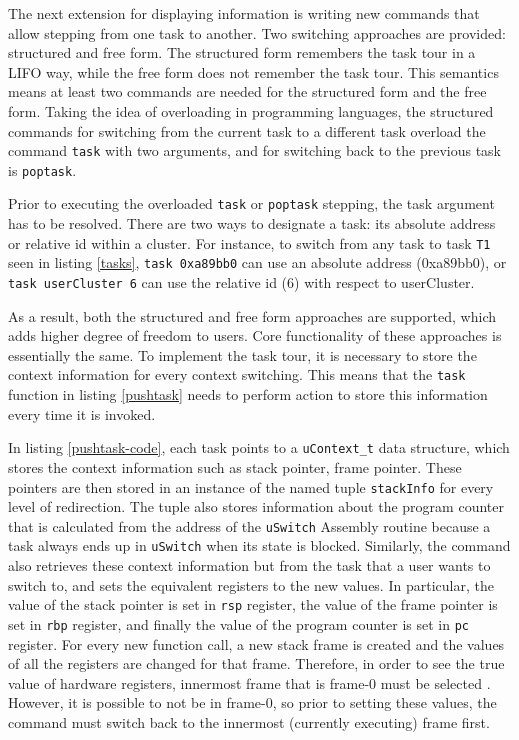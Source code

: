 The next extension for displaying information is writing new commands that allow
stepping from one \uCCS task to another. Two switching approaches are
provided: structured and free form. The structured form remembers the task tour in a
LIFO way, while the free form does not remember the task tour. This semantics means
at least two commands are needed for the structured form and the free form.
Taking the idea of overloading in programming languages, the structured
commands for switching from the current task to a different task overload the
command \verb|task| with two  arguments, and
for switching back to the previous task is \verb|poptask|.

Prior to executing the overloaded \verb|task| or \verb|poptask| stepping, the
task argument has to be resolved. There are two ways to designate a task: its
absolute address or relative id within a cluster. For instance, to switch from
any task to task \verb|T1| seen in listing \ref{tasks}, \verb|task 0xa89bb0| can use an absolute address (0xa89bb0), or \verb|task userCluster 6| can use the relative id (6) with respect to userCluster.

As a result, both the structured and free form approaches are supported, which
adds higher degree of freedom to users. Core functionality of these approaches
is essentially the same. To implement the task tour, it is necessary
to store the context information for every context switching. This means that
the \verb|task| function in listing \ref{pushtask} needs to perform action to
store this information every time it is invoked.

In listing \ref{pushtask-code}, each task points to a \verb|uContext_t| data
structure, which stores the context
information such as stack pointer, frame pointer. These pointers are then
stored in an instance of the named tuple \verb|stackInfo| for every level of
redirection. The tuple also stores information about the program counter that
is calculated from the address of the \verb|uSwitch| Assembly routine because a task always ends up in \verb|uSwitch| when its state is blocked. Similarly, the command
also retrieves these context information but from the task that a user wants to switch to, and
sets the equivalent registers to the new values. In particular, the value of the stack
pointer is set in \verb|rsp| register, the value of the frame pointer is set in \verb|rbp|
register, and finally the value of the program counter is set in \verb|pc| register.
For every new function call, a new stack frame is created and the values of all
the registers are changed for that frame. Therefore, in
order to see the true value of hardware registers, innermost frame that is
frame-0 must be selected \cite{reference11}. However, it is possible to not be in frame-0, so prior to setting these values,
the command must switch back to the innermost (currently executing) frame first.

